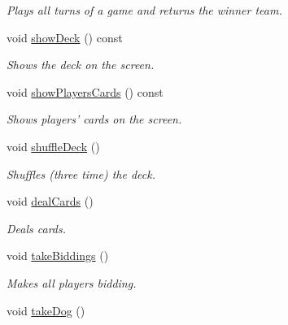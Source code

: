 \begin{DoxyCompactItemize}
\begin{DoxyCompactList}\small\item\em \-Plays all turns of a game and returns the winner team. \end{DoxyCompactList}\item 
\hypertarget{classGame_a1e9e48c10a9ca4bc66b69e05b983e3ab}{void \hyperlink{classGame_a1e9e48c10a9ca4bc66b69e05b983e3ab}{show\-Deck} () const }\label{classGame_a1e9e48c10a9ca4bc66b69e05b983e3ab}

\begin{DoxyCompactList}\small\item\em \-Shows the deck on the screen. \end{DoxyCompactList}\item 
\hypertarget{classGame_aed6d30748ef9db0a89fba543fa4b5dfb}{void \hyperlink{classGame_aed6d30748ef9db0a89fba543fa4b5dfb}{show\-Players\-Cards} () const }\label{classGame_aed6d30748ef9db0a89fba543fa4b5dfb}

\begin{DoxyCompactList}\small\item\em \-Shows players' cards on the screen. \end{DoxyCompactList}\item 
\hypertarget{classGame_a8eb0a092d23b426a8b4b03c4083b7afe}{void \hyperlink{classGame_a8eb0a092d23b426a8b4b03c4083b7afe}{shuffle\-Deck} ()}\label{classGame_a8eb0a092d23b426a8b4b03c4083b7afe}

\begin{DoxyCompactList}\small\item\em \-Shuffles (three time) the deck. \end{DoxyCompactList}\item 
\hypertarget{classGame_a234bc66c5663548d90368ecd142591b2}{void \hyperlink{classGame_a234bc66c5663548d90368ecd142591b2}{deal\-Cards} ()}\label{classGame_a234bc66c5663548d90368ecd142591b2}

\begin{DoxyCompactList}\small\item\em \-Deals cards. \end{DoxyCompactList}\item 
\hypertarget{classGame_ae8240e18a7b5ed1adec7663278afc256}{void \hyperlink{classGame_ae8240e18a7b5ed1adec7663278afc256}{take\-Biddings} ()}\label{classGame_ae8240e18a7b5ed1adec7663278afc256}

\begin{DoxyCompactList}\small\item\em \-Makes all players bidding. \end{DoxyCompactList}\item 
\hypertarget{classGame_ab725d07327db4dfb836e90eb08c83393}{void \hyperlink{classGame_ab725d07327db4dfb836e90eb08c83393}{take\-Dog} ()}\label{classGame_ab725d07327db4dfb836e90eb08c83393}


\end{DoxyCompactItemize}
